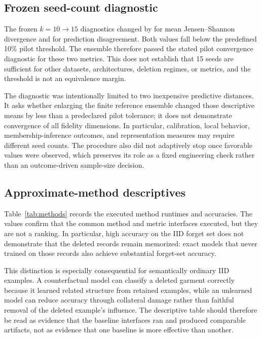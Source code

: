\subsection{Frozen seed-count diagnostic}
The frozen $k=10\rightarrow15$ diagnostics changed by \PilotJSConvergence{} for mean
Jensen--Shannon divergence and \PilotDisagreementConvergence{} for prediction disagreement.
Both values fall below the predefined 10\% pilot threshold. The ensemble therefore passed
the stated pilot convergence diagnostic for these two metrics. This does not establish
that 15 seeds are sufficient for other datasets, architectures, deletion regimes, or
metrics, and the threshold is not an equivalence margin.

The diagnostic was intentionally limited to two inexpensive predictive distances. It asks
whether enlarging the finite reference ensemble changed those descriptive means by less
than a predeclared pilot tolerance; it does not demonstrate convergence of all fidelity
dimensions. In particular, calibration, local behavior, membership-inference outcomes,
and representation measures may require different seed counts. The procedure also did not
adaptively stop once favorable values were observed, which preserves its role as a fixed
engineering check rather than an outcome-driven sample-size decision.

\subsection{Approximate-method descriptives}
Table~\ref{tab:methods} records the executed method runtimes and accuracies. The values
confirm that the common method and metric interfaces executed, but they are not a ranking.
In particular, high accuracy on the IID forget set does not demonstrate that the deleted
records remain memorized: exact models that never trained on those records also achieve
substantial forget-set accuracy.

This distinction is especially consequential for semantically ordinary IID examples. A
counterfactual model can classify a deleted garment correctly because it learned related
structure from retained examples, while an unlearned model can reduce accuracy through
collateral damage rather than faithful removal of the deleted example's influence. The
descriptive table should therefore be read as evidence that the baseline interfaces ran and
produced comparable artifacts, not as evidence that one baseline is more effective than
another.
\begin{table}[ht]
\centering
\caption{Descriptive P001 outputs for approximate methods. These values are not interpreted
as confirmatory unlearning outcomes because the deletion assay was retrospectively U0.}
\label{tab:methods}
\small

\end{table}

